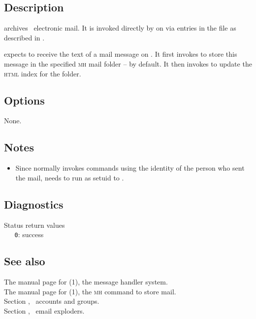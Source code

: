 \subsection*{Description}

 archives \aipspp\ electronic mail.  It is invoked directly by
 on  via entries in the
 file as described in .

 expects to receive the text of a mail message on .
It first invokes  to store this message in the specified
\textsc{mh} mail folder --  by default.  It then invokes
 to update the \textsc{html} index for the folder.

\subsection*{Options}

None.

\subsection*{Notes}

\begin{itemize}
\item
   Since  normally invokes commands using the identity of
   the person who sent the mail,  needs to run as setuid to
   .
\end{itemize}

\subsection*{Diagnostics}

Status return values
\\ \verb+   0+: success

\subsection*{See also}

The manual page for (1), the message handler system.\\
The manual page for (1), the \textsc{mh} command to store
   mail.\\
Section , \aipspp\ accounts and groups.\\
Section , \aipspp\ email exploders.

